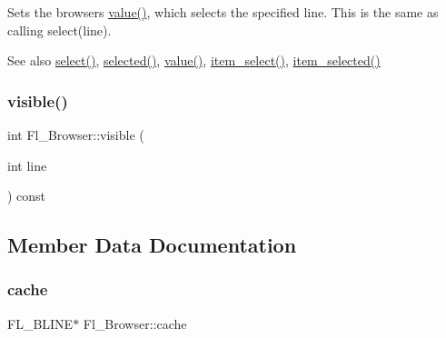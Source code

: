 Sets the browser\textquotesingle{}s \hyperlink{class_fl___browser_ab5fb4b7c3981af6d05399fec54eb1aa9}{value()}, which selects the specified {\ttfamily line}. This is the same as calling select(line). \begin{DoxySeeAlso}{See also}
\hyperlink{class_fl___browser_aeeb8ee901d16becf815c258505fc3ceb}{select()}, \hyperlink{class_fl___browser_aca66dd0e41251d25abefbcff1602194d}{selected()}, \hyperlink{class_fl___browser_ab5fb4b7c3981af6d05399fec54eb1aa9}{value()}, \hyperlink{class_fl___browser_afe09fb2afd71d7504d23742d11327be1}{item\+\_\+select()}, \hyperlink{class_fl___browser_af407fce6bdc3c2892aad6a38ef647f9e}{item\+\_\+selected()} 
\end{DoxySeeAlso}
\mbox{\label{class_fl___browser_a04052ea5a7c193a09df752b7fe4595df}} 
\subsubsection{\texorpdfstring{visible()}{visible()}}
{\footnotesize\ttfamily int Fl\+\_\+\+Browser\+::visible (\begin{DoxyParamCaption}\item[{int}]{line }\end{DoxyParamCaption}) const}



\subsection{Member Data Documentation}
\mbox{\label{class_fl___browser_ac1e223beb3282fb60915aa63c877e012}} 
\subsubsection{\texorpdfstring{cache}{cache}}
{\footnotesize\ttfamily F\+L\+\_\+\+B\+L\+I\+NE$\ast$ Fl\+\_\+\+Browser\+::cache\hspace{0.3cm}{\ttfamily [private]}}

\mbox{\label{class_fl___browser_a9d50777de5e759b2ca4d08f86bd138fc}} 
